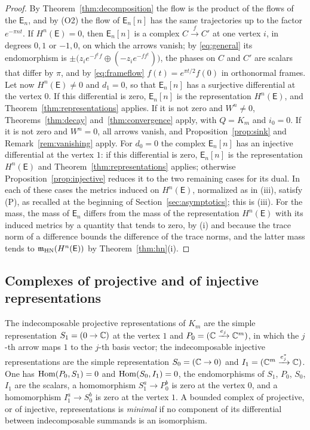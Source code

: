 \begin{proof}
By Theorem~\ref{thm:decomposition} the flow is the product of the flows of
the $\mathsf E_n$, and by (O2) the flow of $\mathsf E_n[n]$ has the same
trajectories up to the factor $e^{-\pi nt}$. If $H^n(\mathsf E)=0$, then
$\mathsf E_n[n]$ is a complex $C\xrightarrow fC'$ at one vertex $i$, in
degrees $0,1$ or $-1,0$, on which the arrows vanish; by \eqref{eq:general}
its endomorphism is
$\pm\bigl(z_ie^{-f^\dagger f}\oplus(-z_ie^{-ff^\dagger})\bigr)$, the phases on
$C$ and $C'$ are scalars that differ by $\pi$, and by \eqref{eq:frameflow}
$f(t)=e^{\pi t/2}f(0)$ in orthonormal frames. Let now
$H^n(\mathsf E)\neq0$ and $d_1=0$, so that $\mathsf E_n[n]$ has a surjective
differential at the vertex $0$. If this differential is zero,
$\mathsf E_n[n]$ is the representation $H^n(\mathsf E)$, and
Theorem~\ref{thm:representations} applies. If it is not zero and $W^n\neq0$,
Theorems~\ref{thm:decay} and~\ref{thm:convergence} apply, with $Q=K_m$ and
$i_0=0$. If it is not zero and $W^n=0$, all arrows vanish, and
Proposition~\ref{prop:sink} and Remark~\ref{rem:vanishing} apply. For
$d_0=0$ the complex $\mathsf E_n[n]$ has an injective differential at the
vertex $1$: if this differential is zero, $\mathsf E_n[n]$ is the
representation $H^n(\mathsf E)$ and Theorem~\ref{thm:representations}
applies; otherwise Proposition~\ref{prop:injective} reduces it to the two
remaining cases for its dual. In each of these cases the metrics induced on
$H^n(\mathsf E)$, normalized as in (iii), satisfy (P), as recalled at the
beginning of Section~\ref{sec:asymptotics}; this is (iii). For the mass, the
mass of $\mathsf E_n$ differs from the mass of the representation
$H^n(\mathsf E)$ with its induced metrics by a quantity that tends to zero,
by (i) and because the trace norm of a difference bounds the difference of
the trace norms, and the latter mass tends to
$\mathfrak m_{\mathrm{HN}}(H^n(\mathsf E))$ by Theorem~\ref{thm:hn}(i).
\end{proof}

\subsection{Complexes of projective and of injective representations}
The indecomposable projective representations of $K_m$ are the simple
representation $S_1=(0\to\mathbb C)$ at the vertex $1$ and
$P_0=(\mathbb C\xrightarrow{e_j}\mathbb C^m)$, in which the $j$-th arrow maps $1$ to the
$j$-th basis vector; the indecomposable injective representations are the
simple representation $S_0=(\mathbb C\to0)$ and $I_1=(\mathbb C^m\xrightarrow{e_j^*}\mathbb C)$.
One has $\operatorname{Hom}(P_0,S_1)=0$ and $\operatorname{Hom}(S_0,I_1)=0$, the endomorphisms of $S_1$,
$P_0$, $S_0$, $I_1$ are the scalars, a homomorphism $S_1^a\to P_0^b$ is zero
at the vertex $0$, and a homomorphism $I_1^a\to S_0^b$ is zero at the vertex
$1$. A bounded complex of projective, or of injective, representations is
\emph{minimal} if no component of its differential between indecomposable
summands is an isomorphism.

